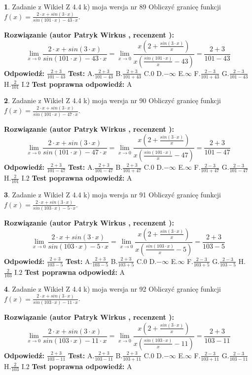 \documentclass[12pt, a4paper]{article}
\theoremstyle{definition} %
\newtheorem{zad}{}
\newcommand{\zadStart}[1]{\begin{zad}#1\newline}
\newcommand{\zadStop}{\end{zad}}
\newcommand{\rozwStart}[2]{\noindent \textbf{Rozwiązanie (autor #1 , recenzent #2): }\newline}
\newcommand{\rozwStop}{\newline}
\newcommand{\odpStart}{\noindent \textbf{Odpowiedź:}\newline}
\newcommand{\odpStop}{\newline}
\newcommand{\testStart}{\noindent \textbf{Test:}\newline}
\newcommand{\testStop}{\newline}
\newcommand{\kluczStart}{\noindent \textbf{Test poprawna odpowiedź:}\newline}
\newcommand{\kluczStop}{\newline}
\begin{document}
\zadStart{Zadanie z Wikieł Z 4.4 k) moja wersja nr 89}
Obliczyć granicę funkcji $f(x)=\frac{2\cdot x +sin(3\cdot x)}{sin(101\cdot x) -43\cdot x}$.
\zadStop
\rozwStart{Patryk Wirkus}{}
$$\lim\limits_{x\to 0}\frac{2\cdot x +sin(3\cdot x)}{sin(101\cdot x) -43\cdot x}
=\lim\limits_{x\to 0}\frac{x(2+\frac{sin(3\cdot x)}{x})}{x(\frac{sin(101\cdot x)}{x}-43)}
=\frac{2+3}{101-43}$$
\rozwStop
\odpStart
$\frac{2+3}{101-43}$
\odpStop
\testStart
A.$\frac{2+3}{101-43}$
B.$\frac{2+3}{101+43}$
C.$0$
D.$-\infty$
E.$\infty$
F.$\frac{2-3}{101+43}$
G.$\frac{2-3}{101-43}$
H.$\frac{2}{101}$
I.$2$
\testStop
\kluczStart
A
\kluczStop



\zadStart{Zadanie z Wikieł Z 4.4 k) moja wersja nr 90}
Obliczyć granicę funkcji $f(x)=\frac{2\cdot x +sin(3\cdot x)}{sin(101\cdot x) -47\cdot x}$.
\zadStop
\rozwStart{Patryk Wirkus}{}
$$\lim\limits_{x\to 0}\frac{2\cdot x +sin(3\cdot x)}{sin(101\cdot x) -47\cdot x}
=\lim\limits_{x\to 0}\frac{x(2+\frac{sin(3\cdot x)}{x})}{x(\frac{sin(101\cdot x)}{x}-47)}
=\frac{2+3}{101-47}$$
\rozwStop
\odpStart
$\frac{2+3}{101-47}$
\odpStop
\testStart
A.$\frac{2+3}{101-47}$
B.$\frac{2+3}{101+47}$
C.$0$
D.$-\infty$
E.$\infty$
F.$\frac{2-3}{101+47}$
G.$\frac{2-3}{101-47}$
H.$\frac{2}{101}$
I.$2$
\testStop
\kluczStart
A
\kluczStop



\zadStart{Zadanie z Wikieł Z 4.4 k) moja wersja nr 91}
Obliczyć granicę funkcji $f(x)=\frac{2\cdot x +sin(3\cdot x)}{sin(103\cdot x) -5\cdot x}$.
\zadStop
\rozwStart{Patryk Wirkus}{}
$$\lim\limits_{x\to 0}\frac{2\cdot x +sin(3\cdot x)}{sin(103\cdot x) -5\cdot x}
=\lim\limits_{x\to 0}\frac{x(2+\frac{sin(3\cdot x)}{x})}{x(\frac{sin(103\cdot x)}{x}-5)}
=\frac{2+3}{103-5}$$
\rozwStop
\odpStart
$\frac{2+3}{103-5}$
\odpStop
\testStart
A.$\frac{2+3}{103-5}$
B.$\frac{2+3}{103+5}$
C.$0$
D.$-\infty$
E.$\infty$
F.$\frac{2-3}{103+5}$
G.$\frac{2-3}{103-5}$
H.$\frac{2}{103}$
I.$2$
\testStop
\kluczStart
A
\kluczStop



\zadStart{Zadanie z Wikieł Z 4.4 k) moja wersja nr 92}
Obliczyć granicę funkcji $f(x)=\frac{2\cdot x +sin(3\cdot x)}{sin(103\cdot x) -11\cdot x}$.
\zadStop
\rozwStart{Patryk Wirkus}{}
$$\lim\limits_{x\to 0}\frac{2\cdot x +sin(3\cdot x)}{sin(103\cdot x) -11\cdot x}
=\lim\limits_{x\to 0}\frac{x(2+\frac{sin(3\cdot x)}{x})}{x(\frac{sin(103\cdot x)}{x}-11)}
=\frac{2+3}{103-11}$$
\rozwStop
\odpStart
$\frac{2+3}{103-11}$
\odpStop
\testStart
A.$\frac{2+3}{103-11}$
B.$\frac{2+3}{103+11}$
C.$0$
D.$-\infty$
E.$\infty$
F.$\frac{2-3}{103+11}$
G.$\frac{2-3}{103-11}$
H.$\frac{2}{103}$
I.$2$
\testStop
\kluczStart
A
\kluczStop
\end{document}
